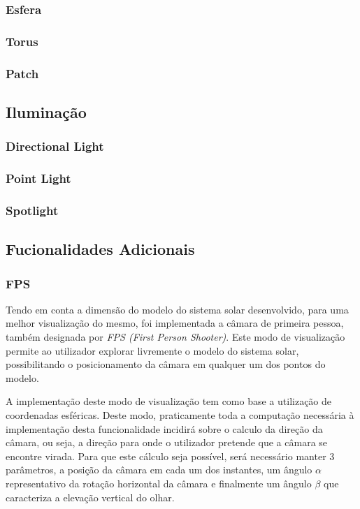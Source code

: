 \documentclass[a4paper]{article}
\begin{document}
\subsubsection{Esfera}
\subsubsection{Torus}%
\subsubsection{Patch}


\subsection{Iluminação} %

\subsubsection{Directional Light}
\subsubsection{Point Light}
\subsubsection{Spotlight}

\subsection{Fucionalidades Adicionais}

\subsubsection{FPS} %

\hspace{3mm} Tendo em conta a dimensão do modelo do sistema solar desenvolvido, para uma melhor visualização do mesmo, foi implementada a câmara de primeira pessoa, também designada por \textit{FPS (First Person Shooter)}. Este modo de visualização permite ao utilizador explorar livremente o modelo do sistema solar, possibilitando o posicionamento da câmara em qualquer um dos pontos do modelo.

A implementação deste modo de visualização tem como base a utilização de coordenadas esféricas. Deste modo, praticamente toda a computação necessária à implementação desta funcionalidade incidirá sobre o calculo da direção da câmara, ou seja, a direção para onde o utilizador pretende que a câmara se encontre virada. Para que este cálculo seja possível, será necessário manter 3 parâmetros, a posição da câmara em cada um dos instantes, um ângulo $\alpha$ representativo da rotação horizontal da câmara e finalmente um ângulo $\beta$ que caracteriza a elevação vertical do olhar.
\end{document}
